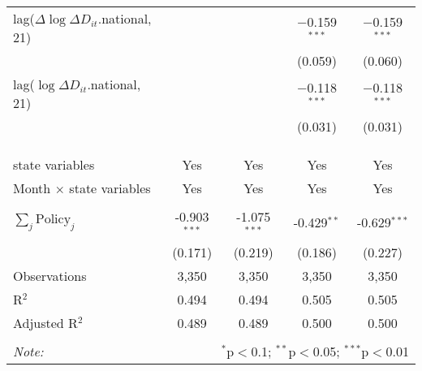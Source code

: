 \begin{tabular}{@{\extracolsep{1pt}}lcccc}
  lag($\Delta \log \Delta D_{it}$.national, 21) &  &  & $-$0.159$^{***}$ & $-$0.159$^{***}$ \\ 
  &  &  & (0.059) & (0.060) \\ 
  lag($\log \Delta D_{it}$.national, 21) &  &  & $-$0.118$^{***}$ & $-$0.118$^{***}$ \\ 
  &  &  & (0.031) & (0.031) \\ 
   &  &  &  &  \\ 
  &  &  &  &  \\ 
 \hline \\[-1.8ex] 
state variables & Yes & Yes & Yes & Yes \\ 
Month $\times$ state variables & Yes & Yes & Yes & Yes \\ 
\hline \\[-1.8ex] 
$\sum_j \mathrm{Policy}_j$ & -0.903$^{***}$ & -1.075$^{***}$ & -0.429$^{**}$ & -0.629$^{***}$ \\ 
 & (0.171) & (0.219) & (0.186) & (0.227) \\ 
Observations & 3,350 & 3,350 & 3,350 & 3,350 \\ 
R$^{2}$ & 0.494 & 0.494 & 0.505 & 0.505 \\ 
Adjusted R$^{2}$ & 0.489 & 0.489 & 0.500 & 0.500 \\ 
\hline 
\hline \\[-1.8ex] 
\textit{Note:}  & \multicolumn{4}{r}{$^{*}$p$<$0.1; $^{**}$p$<$0.05; $^{***}$p$<$0.01} \\ 
\end{tabular} 